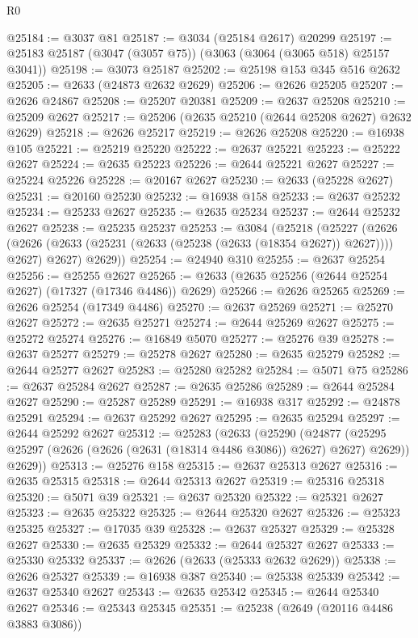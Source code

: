 \begin{lexlean}{R0}
\begin{coremodule}
@25184 := @3037 @81
@25187 := @3034 (@25184 @2617) @20299
@25197 := @25183 @25187 (@3047 (@3057 @75)) (@3063 (@3064 (@3065 @518) @25157 @3041))
@25198 := @3073 @25187
@25202 := @25198 @153 @345 @516 @2632
@25205 := @2633 (@24873 @2632 @2629)
@25206 := @2626 @25205
@25207 := @2626 @24867
@25208 := @25207 @20381
@25209 := @2637 @25208
@25210 := @25209 @2627
@25217 := @25206 (@2635 @25210 (@2644 @25208 @2627) @2632 @2629)
@25218 := @2626 @25217
@25219 := @2626 @25208
@25220 := @16938 @105
@25221 := @25219 @25220
@25222 := @2637 @25221
@25223 := @25222 @2627
@25224 := @2635 @25223
@25226 := @2644 @25221 @2627
@25227 := @25224 @25226
@25228 := @20167 @2627
@25230 := @2633 (@25228 @2627)
@25231 := @20160 @25230
@25232 := @16938 @158
@25233 := @2637 @25232
@25234 := @25233 @2627
@25235 := @2635 @25234
@25237 := @2644 @25232 @2627
@25238 := @25235 @25237
@25253 := @3084
    (@25218
      (@25227
        (@2626 (@2626 (@2633 (@25231 (@2633 (@25238 (@2633 (@18354 @2627)) @2627)))) @2627) @2627)
        @2629))
@25254 := @24940 @310
@25255 := @2637 @25254
@25256 := @25255 @2627
@25265 := @2633 (@2635 @25256 (@2644 @25254 @2627) (@17327 (@17346 @4486)) @2629)
@25266 := @2626 @25265
@25269 := @2626 @25254 (@17349 @4486)
@25270 := @2637 @25269
@25271 := @25270 @2627
@25272 := @2635 @25271
@25274 := @2644 @25269 @2627
@25275 := @25272 @25274
@25276 := @16849 @5070
@25277 := @25276 @39
@25278 := @2637 @25277
@25279 := @25278 @2627
@25280 := @2635 @25279
@25282 := @2644 @25277 @2627
@25283 := @25280 @25282
@25284 := @5071 @75
@25286 := @2637 @25284 @2627
@25287 := @2635 @25286
@25289 := @2644 @25284 @2627
@25290 := @25287 @25289
@25291 := @16938 @317
@25292 := @24878 @25291
@25294 := @2637 @25292 @2627
@25295 := @2635 @25294
@25297 := @2644 @25292 @2627
@25312 := @25283
    (@2633
      (@25290
        (@24877 (@25295 @25297 (@2626 (@2626 (@2631 (@18314 @4486 @3086)) @2627) @2627) @2629))
        @2629))
@25313 := @25276 @158
@25315 := @2637 @25313 @2627
@25316 := @2635 @25315
@25318 := @2644 @25313 @2627
@25319 := @25316 @25318
@25320 := @5071 @39
@25321 := @2637 @25320
@25322 := @25321 @2627
@25323 := @2635 @25322
@25325 := @2644 @25320 @2627
@25326 := @25323 @25325
@25327 := @17035 @39
@25328 := @2637 @25327
@25329 := @25328 @2627
@25330 := @2635 @25329
@25332 := @2644 @25327 @2627
@25333 := @25330 @25332
@25337 := @2626 (@2633 (@25333 @2632 @2629))
@25338 := @2626 @25327
@25339 := @16938 @387
@25340 := @25338 @25339
@25342 := @2637 @25340 @2627
@25343 := @2635 @25342
@25345 := @2644 @25340 @2627
@25346 := @25343 @25345
@25351 := @25238 (@2649 (@20116 @4486 @3883 @3086))

\end{coremodule}
\end{lexlean}
